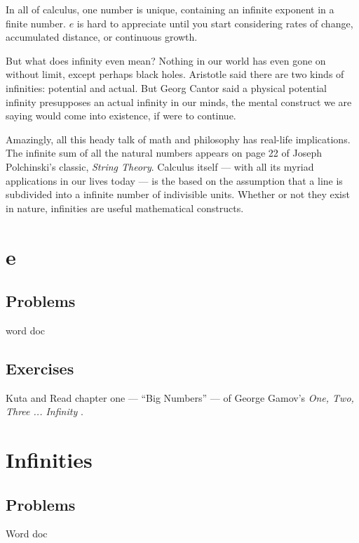 


In all of calculus, one number is unique, containing an infinite exponent in a finite number.
$e$ is hard to appreciate until you start considering rates of change, 
accumulated distance, or continuous growth.  

But what does infinity even mean?  Nothing in our world has even gone on without limit,
except perhaps black holes.  Aristotle said there are two kinds of infinities: potential and
actual.  But Georg Cantor said a physical potential infinity presupposes an actual infinity
in our minds, the mental construct we are saying would come into existence, if were to 
continue.

Amazingly, all this heady talk of math and philosophy has real-life implications.  The infinite
sum of all the natural numbers appears on page 22 of Joseph Polchinski's classic, 
\textit{String Theory}.  Calculus itself --- with all its myriad applications in our lives today
--- is the based on the assumption that a line is subdivided into a infinite number of
indivisible units.  Whether or not they exist in nature, infinities are useful mathematical
constructs.





\newpage
\chapterminitoc

\newpage
\section{e}
\subsection{Problems}
word doc
\newpage

\newpage
\subsection{Exercises}
Kuta and
Read chapter one --- ``Big Numbers'' --- of George Gamov's
\textit{One, Two, Three ... Infinity} .



\newpage
\section{Infinities}
\subsection{Problems}
Word doc
\newpage

\newpage



